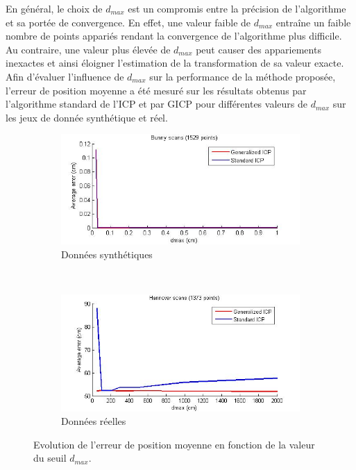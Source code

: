 En général, le choix de $d_{max}$ est un compromis entre la précision de l'algorithme et sa portée de convergence. En effet, une valeur faible de $d_{max}$ entraîne un faible nombre de points appariés rendant la convergence de l'algorithme plus difficile. Au contraire, une valeur plus élevée de $d_{max}$ peut causer des appariements inexactes et ainsi éloigner l'estimation de la transformation de sa valeur exacte.\\

Afin d'évaluer l'influence de $d_{max}$ sur la performance de la méthode proposée, l'erreur de position moyenne a été mesuré sur les résultats obtenus par l'algorithme standard de l'ICP et par GICP pour différentes valeurs de $d_{max}$ sur les jeux de donnée  synthétique et réel.\\


\begin{figure}[!h]
   \centering
   \begin{subfigure}[t]{.5\linewidth}
     \centering
     \includegraphics[scale=0.4]{Images/Resultats/bunny_evol_error_dmax.jpg}
     \caption{Données synthétiques}
     \label{fig:err_dmax_synthe}
   \end{subfigure}%
   ~
   \begin{subfigure}[t]{.5\linewidth}
     \centering
     \includegraphics[scale=0.4]{Images/Resultats/hannover_evol_error_dmax.jpg}
     \caption{Données réelles}
     \label{fig:err_dmax_reelle}
   \end{subfigure}
   
   \caption{Evolution de l'erreur de position moyenne en fonction de la valeur du seuil $d_{max}$.}
   \label{fig:err_dmax}
\end{figure}



